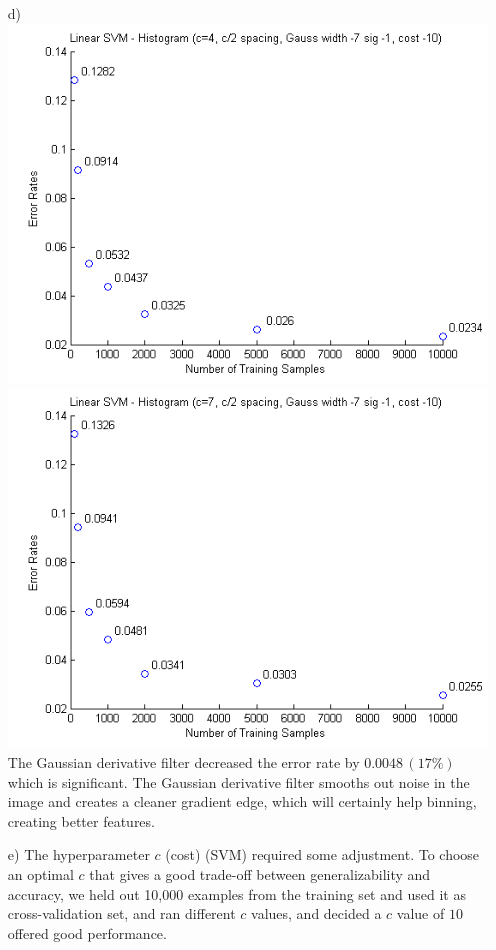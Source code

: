 \documentclass[11pt]{article}
\begin{document}
\begin{itemize}
\item[d)]
\includegraphics[scale=0.6]{diagrams/Question13d1.png}
\includegraphics[scale=0.6]{diagrams/Question13d2.png}\\
The Gaussian derivative filter decreased the error rate by $0.0048\,(17\%)$ which is significant. The Gaussian derivative filter smooths out noise in the image and creates a cleaner gradient edge, which will certainly help binning, creating better features.
\item[e)]
The hyperparameter $c$ (cost) (SVM) required some adjustment. To choose an optimal $c$ that gives a good trade-off between generalizability and accuracy, we held out 10,000 examples from the training set and used it as cross-validation set, and ran different $c$ values, and decided a $c$ value of $10$ offered good performance.
\end{itemize}
\newpage
\end{document}
